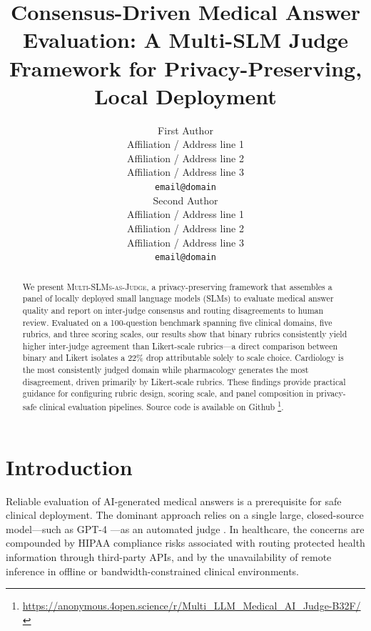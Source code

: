 \documentclass[11pt]{article}
\title{Consensus-Driven Medical Answer Evaluation: A Multi-SLM Judge Framework for Privacy-Preserving, Local Deployment}
\author{First Author \\
  Affiliation / Address line 1 \\
  Affiliation / Address line 2 \\
  Affiliation / Address line 3 \\
  \texttt{email@domain} \\\And
  Second Author \\
  Affiliation / Address line 1 \\
  Affiliation / Address line 2 \\
  Affiliation / Address line 3 \\
  \texttt{email@domain} \\}
\begin{document}
\maketitle
\begin{abstract}
We present \textsc{Multi-SLMs-as-Judge}, a privacy-preserving framework that assembles a panel of locally deployed small language models (SLMs) to evaluate medical answer quality and report on inter-judge consensus and routing disagreements to human review. Evaluated on a 100-question benchmark spanning five clinical domains, five rubrics, and three scoring scales, our results show that binary rubrics consistently yield higher inter-judge agreement than Likert-scale rubrics—a direct comparison between binary and Likert isolates a 22\% drop attributable solely to scale choice. Cardiology is the most consistently judged domain while pharmacology generates the most disagreement, driven primarily by Likert-scale rubrics. These findings provide practical guidance for configuring rubric design, scoring scale, and panel composition in privacy-safe clinical evaluation pipelines. Source code is available on Github \footnote{\url{https://anonymous.4open.science/r/Multi_LLM_Medical_AI_Judge-B32F/}}.
\end{abstract}

\section{Introduction}

Reliable evaluation of AI-generated medical answers is a prerequisite for safe clinical deployment. The dominant approach relies on a single large, closed-source model—such as GPT-4 \cite{achiam2023gpt}—as an automated judge \citep{zheng2023judging}. In healthcare, the concerns are compounded by HIPAA compliance risks associated with routing protected health information through third-party APIs, and by the unavailability of remote inference in offline or bandwidth-constrained clinical environments.

\end{document}
